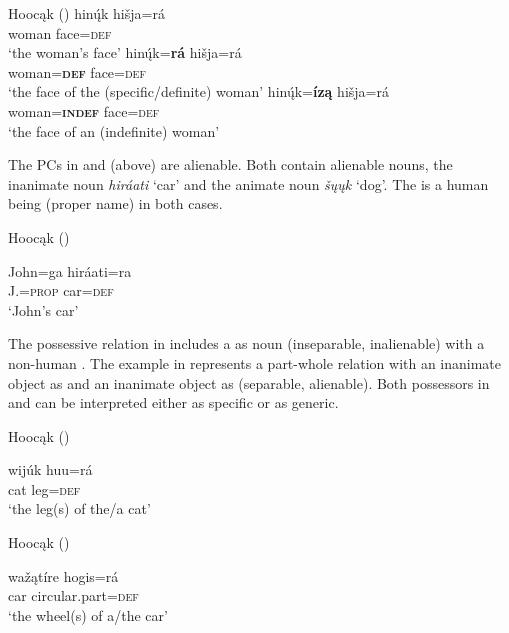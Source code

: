 \documentclass[output=paper]{LSP/langsci}
\begin{document}
\ea {}Hoocąk (\citealt[13]{Helmbrecht2003})\label{womansface}
\ea \label{womansfacea}
\gll hinų́k    hišja=rá \\
woman face=\textsc{def} \\
\glt `the woman's face'
\ex\label{womansfaceb}
\gll hinų́k=\textbf{rá}         hišja=rá \\
woman=\textbf{\textsc{def}} face=\textsc{def} \\
\trans `the face of the (specific/definite) woman'
\ex\label{womansfacec}
\gll hinų́k=\textbf{íz\k{a}} hišja=rá \\
woman=\textbf{\textsc{indef}}  face=\textsc{def} \\ 
\glt `the face of an (indefinite) woman'
\z
\z

The PCs in  and  (above) are alienable. Both contain alienable  nouns, the inanimate noun \textit{hiráati} `car' and the animate noun \textit{šųųk} `dog'. The  is a human being (proper name) in both cases. 

\ea {}Hoocąk (\citealt[13]{Helmbrecht2003}) \label{johnscar}

\gll John=ga      hiráati=ra \\
J.=\textsc{prop} car=\textsc{def} \\
\glt `John's car'
\z

The possessive relation in  includes a  as  noun (inseparable, inalienable) with a non-human . The example in  represents a part-whole relation with an inanimate object as  and an inanimate object as  (separable, alienable). Both possessors in  and  can be interpreted either as specific or as generic. 

\ea {}Hoocąk (\citealt[13]{Helmbrecht2003}) \label{leg}

\gll wijúk huu=rá \\
cat      leg=\textsc{def} \\
\glt `the leg(s) of the/a cat'
\z

\ea {}Hoocąk (\citealt[13]{Helmbrecht2003}) \label{wheel}

\gll waž\k{a}tíre hogis=rá \\
car  circular.part=\textsc{def} \\
\glt `the wheel(s) of a/the car'
\z
\end{document}
